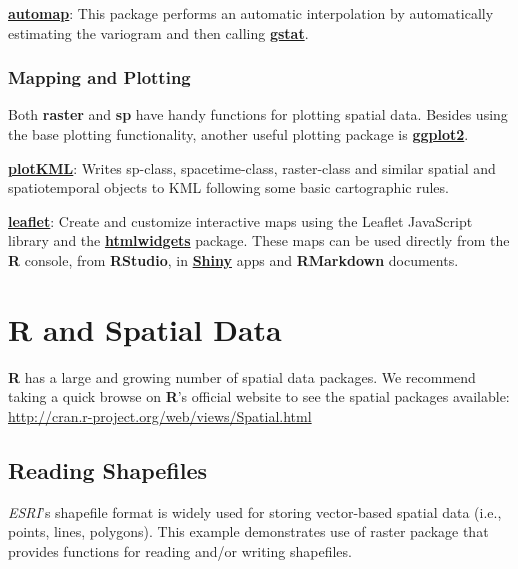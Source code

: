 \documentclass[10pt,b5paper,]{book}
\theoremstyle{definition}
\theoremstyle{definition}
\theoremstyle{definition}
\theoremstyle{remark}
\begin{document}
\href{https://CRAN.R-project.org/package=automap}{\textbf{automap}}:
This package performs an automatic interpolation by automatically
estimating the variogram and then calling
\href{https://CRAN.R-project.org/package=gstat}{\textbf{gstat}}.

\hypertarget{mapping-and-plotting}{%
\subsubsection{Mapping and Plotting}\label{mapping-and-plotting}}

Both \textbf{raster} and \textbf{sp} have handy functions for plotting
spatial data. Besides using the base plotting functionality, another
useful plotting package is
\href{https://cran.r-project.org/web/packages/ggplot2/index.html}{\textbf{ggplot2}}.

\href{https://CRAN.R-project.org/package=plotKML}{\textbf{plotKML}}:
Writes sp-class, spacetime-class, raster-class and similar spatial and
spatiotemporal objects to KML following some basic cartographic rules.

\href{https://CRAN.R-project.org/package=leaflet}{\textbf{leaflet}}:
Create and customize interactive maps using the Leaflet JavaScript
library and the
\href{https://cran.r-project.org/web/packages/htmlwidgets/index.html}{\textbf{htmlwidgets}}
package. These maps can be used directly from the \textbf{R} console,
from \textbf{RStudio}, in
\href{https://shiny.rstudio.com/}{\textbf{Shiny}} apps and
\textbf{RMarkdown} documents.

\hypertarget{r-and-spatial-data}{%
\section{R and Spatial Data}\label{r-and-spatial-data}}

\textbf{R} has a large and growing number of spatial data packages. We
recommend taking a quick browse on \textbf{R}'s official website to see
the spatial packages available:
\url{http://cran.r-project.org/web/views/Spatial.html}

\hypertarget{reading-shapefiles}{%
\subsection{Reading Shapefiles}\label{reading-shapefiles}}

\emph{ESRI}'s shapefile format is widely used for storing vector-based
spatial data (i.e., points, lines, polygons). This example demonstrates
use of raster package that provides functions for reading and/or writing
shapefiles.
\end{document}
